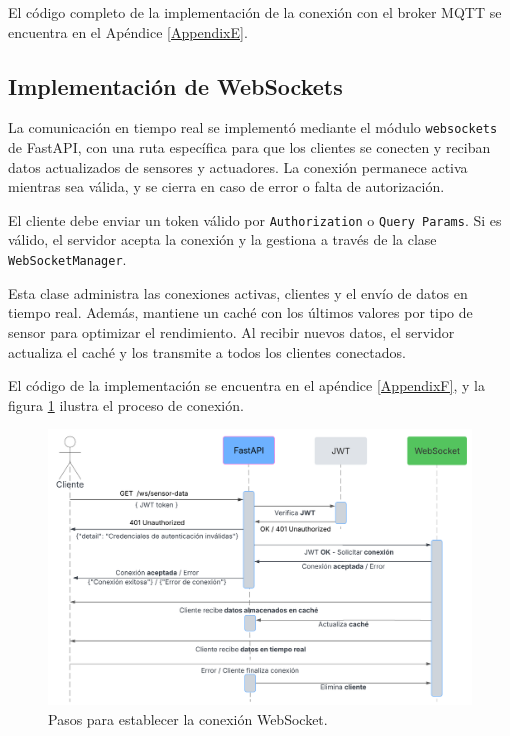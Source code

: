El código completo de la implementación de la conexión con el broker MQTT se
encuentra en el Apéndice \ref{AppendixE}.

\subsection{Implementación de WebSockets}

La comunicación en tiempo real se implementó mediante el módulo
\texttt{websockets} de FastAPI, con una ruta específica para que los clientes
se conecten y reciban datos actualizados de sensores y actuadores. La conexión
permanece activa mientras sea válida, y se cierra en caso de error o falta de
autorización.

El cliente debe enviar un token válido por \texttt{Authorization} o
\texttt{Query Params}. Si es válido, el servidor acepta la conexión y la
gestiona a través de la clase \texttt{WebSocketManager}.

Esta clase administra las conexiones activas, clientes y el envío de datos en
tiempo real. Además, mantiene un caché con los últimos valores por tipo de
sensor para optimizar el rendimiento. Al recibir nuevos datos, el servidor
actualiza el caché y los transmite a todos los clientes conectados.

El código de la implementación se encuentra en el apéndice \ref{AppendixF}, y
la figura \ref{fig:websocket} ilustra el proceso de conexión.

\begin{figure}[H]
    \centering
    \includegraphics[width=.90\textwidth]{./Images/23.png}
    \caption{Pasos para establecer la conexión WebSocket.}
    \label{fig:websocket}
\end{figure}

